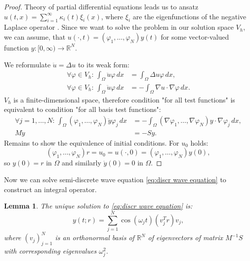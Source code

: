 \documentclass[a4paper,11pt,bibliography=totoc,listof=totoc,headinclude=true,cleardoublepage=empty,oneside]{scrbook}
\newtheorem{lemma}[theorem]{Lemma}
\newcommand{\R}{\mathbb{R}}
\begin{document}
\begin{proof}
    Theory of partial differential equations leads us to ansatz $u(t, x) = \sum_{i=1}^\infty \kappa_i(t) \xi_i(x)$, where $\xi_i$ are the eigenfunctions of the negative Laplace operator \cite[p. 122]{Jungel}. Since we want to solve the problem in our solution space $V_h$, we can assume, that $u(\cdot, t)=(\varphi_1, \dots, \varphi_N)y(t)$ for some vector-valued function $y: [0, \infty) \rightarrow \R^N$.

    We reformulate $\ddot{u} = \Delta u$ to its weak form:
    \begin{align*}
        \forall \varphi \in V_h : \, \int_\Omega \ddot{u} \varphi \, dx &= \int_\Omega \Delta u \varphi \, dx, \\
        \forall \varphi \in V_h : \, \int_\Omega \ddot{u} \varphi \, dx &= - \int_\Omega \nabla  u\cdot  \nabla \varphi \, dx.
    \end{align*}
    $V_h$ is a finite-dimensional space, therefore condition "for all test functions" is equivalent to condition "for all basis test functions":
    \begin{align*}
        \forall j=1, \dots, N:\, \int_\Omega (\varphi_1, \dots, \varphi_N)\ddot{y} \varphi_j \, dx &= -  \int_\Omega (\nabla \varphi_1, \dots, \nabla \varphi_N)y\cdot  \nabla \varphi_j \, dx, \\
        M\ddot{y} &= -Sy.
    \end{align*}
    Remains to show the equivalence of initial conditions. For $u_0$ holds:
    \begin{equation*}
        (\varphi_1, \dots, \varphi_N)r = u_0 = u(\cdot, 0) = (\varphi_1, \dots, \varphi_N)y(0),
    \end{equation*}
    so $y(0) = r$ in $\Omega$ and similarly $\dot{y}(0) = 0$ in $\Omega$.
\end{proof}
Now we can solve semi-discrete wave equation \eqref{eq:discr wave equation} to construct an integral operator. 
\begin{lemma}\label{lemma:y solution}
    The unique solution to \eqref{eq:discr wave equation} is:
    \begin{equation}\label{eq:solution wave eq}
        y(t; r) = \sum_{j=1}^N \cos(\omega_j t) (v_j^T r) v_j,
    \end{equation}
    where $(v_j)_{j=1}^N$ is an orthonormal basis of $\R^N$ of eigenvectors of matrix $M^{-1}S$ with corresponding eigenvalues $\omega_j^2$.
\end{lemma}
\end{document}
